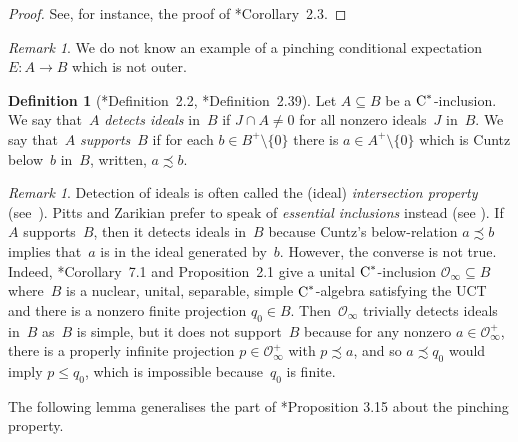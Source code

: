 \documentclass[a4paper]{amsart}
\theoremstyle{plain}
\theoremstyle{definition}
\newtheorem{definition}[theorem]{Definition}
\theoremstyle{remark}
\newtheorem{remark}[theorem]{Remark}
\numberwithin{theorem}{section}
\numberwithin{equation}{section}
\newcommand*{\nb}{\nobreakdash}
\newcommand*{\Cst}{\textup C^*}%
\begin{document}
\begin{proof}
  See, for instance, the proof of \cite{Osaka:SP_property}*{Corollary~2.3}.
\end{proof}

\begin{remark}
  We do not know an example of a pinching conditional expectation
  \(E\colon A\to B\) which is not outer.
\end{remark}

\begin{definition}[\cite{Kwasniewski-Meyer:Aperiodicity}*{Definition~2.2},
  \cite{Kwasniewski:Crossed_products}*{Definition~2.39}]
  \label{def:Cuntz_preorder}
  Let \(A\subseteq B\) be a \(\Cst\)\nb-inclusion.
  We say that~\(A\) \emph{detects ideals} in~\(B\) if \(J\cap A\neq
  0\) for all nonzero ideals~\(J\) in~\(B\).
  We say that~\(A\) \emph{supports}~\(B\) if for each \(b\in
  B^+\setminus\{0\}\) there is \(a\in A^+\setminus\{0\}\) which is
  Cuntz below~\(b\) in~\(B\), written, \(a\precsim b\).
\end{definition}

\begin{remark}
  \label{rem:supporting_detecting}
  Detection of ideals is often called the (ideal) \emph{intersection
    property} (see~\cite{Sierakowski:IdealStructureCrossedProducts}).
  Pitts and Zarikian prefer to speak of \emph{essential inclusions}
  instead (see \cites{Pitts-Zarikian:Unique_pseudoexpectation,
    Zarikian:Unique_pseudo}).
  If~\(A\) supports~\(B\), then it detects ideals in~\(B\) because
  Cuntz's below-relation \(a\precsim b\) implies that~\(a\) is in the
  ideal generated by~\(b\).
  However, the converse is not true.
  Indeed, \cite{Rordam:finite_and_infinite}*{Corollary~7.1
    and Proposition~2.1} give a unital \(\Cst\)\nb-inclusion
  \(\mathcal{O}_\infty\subseteq B\) where~\(B\) is a nuclear, unital,
  separable, simple \(\Cst\)\nb-algebra satisfying the UCT and there
  is a nonzero finite projection \(q_0\in B\).
  Then~\(\mathcal{O}_\infty\) trivially detects ideals in~\(B\)
  as~\(B\) is simple, but it does not support~\(B\) because for any
  nonzero \(a\in \mathcal{O}_\infty^+\), there is a properly infinite
  projection \(p\in \mathcal{O}_\infty^+\) with \(p\precsim a\), and
  so \(a\precsim q_0\) would imply \(p\le q_0\), which is impossible
  because~\(q_0\) is finite.
\end{remark}

The following lemma generalises the part of
\cite{Rordam:Irreducible_inclusions}*{Proposition 3.15} about the
pinching property.
\end{document}
